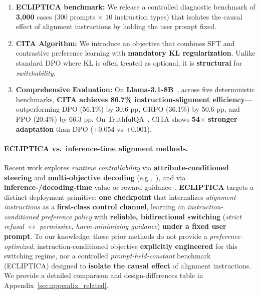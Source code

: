 \vspace{-0.35em}
\begin{enumerate}[leftmargin=*,itemsep=0em]

     \item \textbf{ECLIPTICA benchmark:} We release a controlled diagnostic benchmark of \textbf{3,000} cases ($300$ prompts $\times$ $10$ instruction types) that isolates the causal effect of alignment instructions by holding the user prompt fixed.

    \item \textbf{CITA Algorithm:} We introduce an objective that combines SFT and contrastive preference learning with \textbf{mandatory KL regularization}.
    Unlike standard DPO where KL is often treated as optional, it is \textbf{structural} for \emph{switchability}.

    \item \textbf{Comprehensive Evaluation:} On \textbf{Llama-3.1-8B}~\cite{dubey2024llama}, across five deterministic benchmarks, \textbf{CITA achieves \colorbox{bg-green}{86.7\%} instruction-alignment efficiency}---outperforming DPO (56.1\%) by 30.6 pp, GRPO (36.1\%) by 50.6 pp, and PPO (20.4\%) by 66.3 pp. On TruthfulQA~\cite{lin2022truthfulqa}, CITA shows \textbf{54$\times$ stronger adaptation} than DPO (+0.054 vs +0.001).
\end{enumerate}


\paragraph{ECLIPTICA vs.\ inference-time alignment methods.}
Recent work explores \emph{runtime controllability} via \textbf{attribute-conditioned steering} and \textbf{multi-objective decoding}
(e.g.,~\cite{dong-etal-2023-steerlm,wang-etal-2024-arithmetic,shi2024decodingtime}),
and via \textbf{inference-/decoding-time} value or reward guidance~\cite{liu-etal-2024-inference,chen2025pad}.
\textbf{ECLIPTICA} targets a distinct deployment primitive: \textbf{one checkpoint} that internalizes \emph{alignment instructions} as a \textbf{first-class control channel},
learning an \emph{instruction-conditioned preference policy} with \textbf{reliable, bidirectional switching}
(\emph{strict refusal} $\leftrightarrow$ \emph{permissive, harm-minimizing guidance}) \textbf{under a fixed user prompt}.
To our knowledge, these prior methods do not provide a \emph{preference-optimized}, instruction-conditioned objective \textbf{explicitly engineered} for this switching regime,
nor a controlled \emph{prompt-held-constant} benchmark (ECLIPTICA) designed to \textbf{isolate the causal effect} of alignment instructions.
We provide a detailed comparison and design-differences table in Appendix~\ref{sec:appendix_related}.


